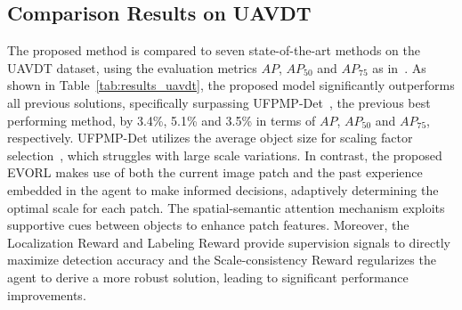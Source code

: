 \documentclass[letterpaper]{article} %
\begin{document}
\subsection{Comparison Results on UAVDT}
\label{sssec:uavdt}
The proposed method is compared %
to seven state-of-the-art methods on the UAVDT dataset, %
using the evaluation metrics ${AP}$, ${AP_{50}}$ and ${AP_{75}}$ as in~\cite{Huang_2022_UFPMP, Xu_2022_AdaZoom}. As shown in Table~\ref{tab:results_uavdt}, the proposed model significantly %
outperforms all previous solutions, specifically surpassing UFPMP-Det~\cite{Huang_2022_UFPMP}, the previous best performing method, by 3.4\%, 5.1\% and 3.5\% in terms of ${AP}$, ${AP_{50}}$ and ${AP_{75}}$, respectively. UFPMP-Det utilizes the average object size %
for scaling factor selection~\cite{Huang_2022_UFPMP}, which struggles with large scale variations. In contrast, the proposed EVORL makes use of both the current image patch and the past experience embedded in the agent to make %
informed decisions, adaptively determining the optimal scale for each patch. The spatial-semantic attention mechanism exploits supportive cues between objects to enhance patch features. Moreover, the Localization Reward and Labeling Reward provide supervision signals to directly maximize detection accuracy and the Scale-consistency Reward regularizes the agent to derive a more robust solution, %
leading to significant performance improvements. 
\end{document}
